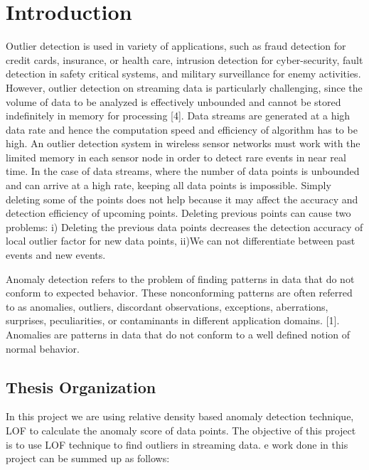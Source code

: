 \chapter{Introduction}

Outlier detection is used in variety of applications, such as fraud detection for credit cards, insurance, or health care, intrusion detection
for cyber-security, fault detection in safety critical systems, and military surveillance
for enemy activities. However, outlier detection on streaming data is particularly
challenging, since the volume of data to be analyzed is
effectively unbounded and cannot be stored indefinitely in
memory for processing [4]. Data streams are generated at a high data rate and hence the computation speed and efficiency of algorithm has to be high. An outlier detection system in wireless sensor
networks must work with the limited memory in each
sensor node in order to detect rare events in near real time. In the
case of data streams, where the number of data points is
unbounded and can arrive at a high rate, keeping all data
points is impossible. Simply deleting some of the points does not help because it may affect the accuracy and detection efficiency of upcoming points. Deleting previous points can cause two problems: i) Deleting the previous data points decreases the detection accuracy of local outlier factor for new data points, ii)We can not differentiate between past events and new events. 


Anomaly detection refers to the problem of finding patterns in data that do not conform
to expected behavior. These nonconforming patterns are often referred to as anomalies,
outliers, discordant observations, exceptions, aberrations, surprises, peculiarities, or contaminants in different application domains. [1]. Anomalies are patterns in data that do not conform to a well defined notion of normal
behavior.



\section{Thesis Organization}

In this project we are using relative density based anomaly detection technique, LOF to calculate the anomaly score of data points. The objective of this project is to use LOF technique to find outliers in streaming data. e work done in this project can be summed up as
follows:


	




